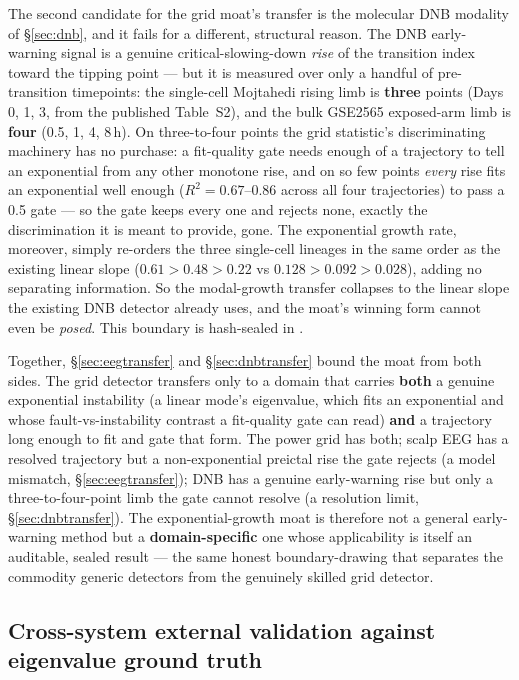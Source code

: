 \documentclass[11pt]{article}
\begin{document}
The second candidate for the grid moat's transfer is the molecular DNB
modality of \S\ref{sec:dnb}, and it fails for a different, structural
reason. The DNB early-warning signal is a genuine
critical-slowing-down \emph{rise} of the transition index toward the
tipping point --- but it is measured over only a handful of
pre-transition timepoints: the single-cell Mojtahedi rising limb is
\textbf{three} points (Days 0, 1, 3, from the published Table~S2), and
the bulk GSE2565 exposed-arm limb is \textbf{four} (0.5, 1, 4, 8\,h). On
three-to-four points the grid statistic's discriminating machinery has
no purchase: a fit-quality gate needs enough of a trajectory to tell an
exponential from any other monotone rise, and on so few points
\emph{every} rise fits an exponential well enough ($R^2 = 0.67$--$0.86$
across all four trajectories) to pass a 0.5 gate --- so the gate keeps
every one and rejects none, exactly the discrimination it is meant to
provide, gone. The exponential growth rate, moreover, simply re-orders
the three single-cell lineages in the same order as the existing linear
slope ($0.61 > 0.48 > 0.22$ vs $0.128 > 0.092 > 0.028$), adding no
separating information. So the modal-growth transfer collapses to the
linear slope the existing DNB detector already uses, and the moat's
winning form cannot even be \emph{posed}. This boundary is hash-sealed
in .

Together, \S\ref{sec:eegtransfer} and \S\ref{sec:dnbtransfer} bound the
moat from both sides. The grid detector transfers only to a domain that
carries \textbf{both} a genuine exponential instability (a linear mode's
eigenvalue, which fits an exponential and whose fault-vs-instability
contrast a fit-quality gate can read) \textbf{and} a trajectory long
enough to fit and gate that form. The power grid has both; scalp EEG has
a resolved trajectory but a non-exponential preictal rise the gate
rejects (a model mismatch, \S\ref{sec:eegtransfer}); DNB has a genuine
early-warning rise but only a three-to-four-point limb the gate cannot
resolve (a resolution limit, \S\ref{sec:dnbtransfer}). The
exponential-growth moat is therefore not a general early-warning method
but a \textbf{domain-specific} one whose applicability is itself an
auditable, sealed result --- the same honest boundary-drawing that
separates the commodity generic detectors from the genuinely skilled
grid detector.

\subsection{Cross-system external validation against eigenvalue ground
truth}\label{sec:andes}
\end{document}
